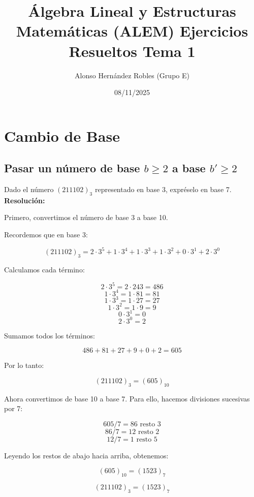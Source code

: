 \documentclass[a4paper,12pt]{article}
\title{Álgebra Lineal y Estructuras Matemáticas (ALEM) Ejercicios Resueltos Tema 1}
\author{Alonso Hernández Robles (Grupo E)}
\date{08/11/2025}
\begin{document}
\maketitle

\tableofcontents
\newpage

\section{Cambio de Base}

\subsection{Pasar un número de base \(b\ge2\) a base \(b'\ge2\)}

\begin{ejercicio}[title=Ejercicio 1]
Dado el número $(211102)_3$ representado en base 3, expréselo en base 7.
\tcblower
\textbf{Resolución:}

Primero, convertimos el número de base 3 a base 10.  

Recordemos que en base 3:

\[
(211102)_3 = 2\cdot 3^5 + 1\cdot 3^4 + 1\cdot 3^3 + 1\cdot 3^2 + 0\cdot 3^1 + 2\cdot 3^0
\]

Calculamos cada término:

\[
2\cdot 3^5 = 2 \cdot 243 = 486
\] 
\[
1\cdot 3^4 = 1 \cdot 81 = 81
\] 
\[
1\cdot 3^3 = 1 \cdot 27 = 27
\] 
\[
1\cdot 3^2 = 1 \cdot 9 = 9
\] 
\[
0\cdot 3^1 = 0
\] 
\[
2\cdot 3^0 = 2
\]

Sumamos todos los términos:

\[
486 + 81 + 27 + 9 + 0 + 2 = 605
\]

Por lo tanto:

\[
(211102)_3 = (605)_{10}
\]

Ahora convertimos de base 10 a base 7. Para ello, hacemos divisiones sucesivas por 7:

\[
605 / 7 = 86 \text{ resto } 3
\] 
\[
86 / 7 = 12 \text{ resto } 2
\] 
\[
12 / 7 = 1 \text{ resto } 5
\]

Leyendo los restos de abajo hacia arriba, obtenemos:

\[
(605)_{10} = (1523)_7
\]

\[
(211102)_3 = \boxed{(1523)_7}
\]

\end{ejercicio}
\end{document}
